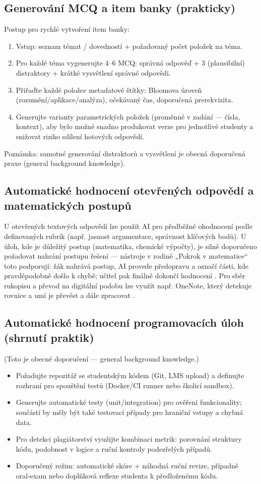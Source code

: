 \documentclass{report}%
\begin{document}
\subsection*{Generování MCQ a item banky (prakticky)}
Postup pro rychlé vytvoření item banky:
\begin{enumerate}
  \item Vstup: seznam témat / dovedností + požadovaný počet položek na téma.
  \item Pro každé téma vygenerujte 4–6 MCQ: správná odpověď + 3 (plausibilní) distraktory + krátké vysvětlení správné odpovědi.
  \item Přiřaďte každé položce metadatové štítky: Bloomova úroveň (rozumění/aplikace/analýza), očekávaný čas, doporučená prerekvizita.
  \item Generujte varianty parametrických položek (proměnné v zadání — čísla, kontext), aby bylo možné snadno produkovat verze pro jednotlivé studenty a snižovat riziko sdílení hotových odpovědí.
\end{enumerate}
Poznámka: samotné generování distraktorů a vysvětlení je obecná doporučená praxe (general background knowledge).

\subsection*{Automatické hodnocení otevřených odpovědí a matematických postupů}
U otevřených textových odpovědí lze použít AI pro předběžné ohodnocení podle definovaných rubrik (např. jasnost argumentace, správnost klíčových bodů). U úloh, kde je důležitý postup (matematika, chemické výpočty), je silně doporučeno požadovat nahrání postupu řešení — nástroje v rodině „Pokrok v matematice“ toto podporují: žák nahrává postup, AI provede předopravu a označí části, kde pravděpodobně došlo k chybě; učitel pak finálně dokončí hodnocení \cite{kb_ai_101_tipu_pdf_04e4a115_page_8_1}. Pro sběr rukopisu a převod na digitální podobu lze využít např. OneNote, který detekuje rovnice a umí je převést a dále zpracovat \cite{kb_ai_101_tipu_pdf_04e4a115_page_8_1}.

\subsection*{Automatické hodnocení programovacích úloh (shrnutí praktik)}
(Toto je obecné doporučení — general background knowledge.)
\begin{itemize}
  \item Požadujte repozitář se studentským kódem (Git, LMS upload) a definujte rozhraní pro spouštění testů (Docker/CI runner nebo školicí sandbox).
  \item Generujte automatické testy (unit/integration) pro ověření funkcionality; součástí by měly být také testovací případy pro hraniční vstupy a chybná data.
  \item Pro detekci plagiátorství využijte kombinaci metrik: porovnání struktury kódu, podobnost v logice a ruční kontroly podezřelých případů.
  \item Doporučený režim: automatické skóre + náhodná ruční revize, případně oral‑exam nebo doplňková reflexe studenta k předloženému kódu.
\end{itemize}
\end{document}
